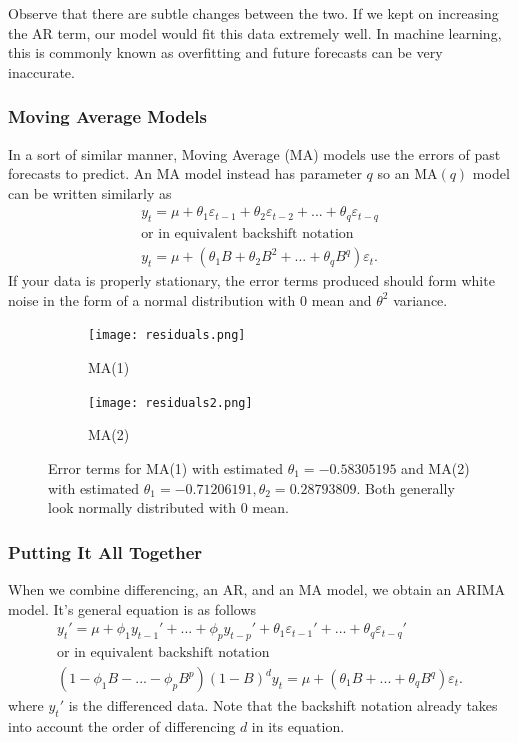 \documentclass{article}
\begin{document}
    Observe that there are subtle changes between the two. If we kept on increasing the AR term, our model would fit this data extremely well. In machine learning, this is commonly known as overfitting and future forecasts can be very inaccurate.

  \subsubsection{Moving Average Models}
    In a sort of similar manner, Moving Average (MA) models use the errors of past forecasts to predict. An MA model instead has parameter $q$ so an MA$(q)$ model can be written similarly as
    \begin{gather*}
      y_t = \mu + \theta_1 \varepsilon_{t-1} + \theta_2 \varepsilon_{t-2} + ... + \theta_q \varepsilon_{t-q}\\
      \text{or in equivalent backshift notation}\\
      y_t = \mu + (\theta_1B + \theta_2B^2 + ... + \theta_qB^q)\varepsilon_t.
    \end{gather*}
    If your data is properly stationary, the error terms produced should form white noise in the form of a normal distribution with $0$ mean and $\theta^2$ variance.

    \begin{figure}[H]
      \centering
      \captionsetup{justification=centering}
      \begin{subfigure}[b]{0.49\linewidth}
        \texttt{[image: residuals.png]}
        \caption{MA(1)}
      \end{subfigure}
      \begin{subfigure}[b]{0.49\linewidth}
        \texttt{[image: residuals2.png]}
        \caption{MA(2)}
      \end{subfigure}
      \caption{Error terms for MA(1) with estimated $\theta_1 = -0.58305195$ and MA(2) with estimated $\theta_1 = -0.71206191, \theta_2 =  0.28793809$. Both generally look normally distributed with 0 mean.}
    \end{figure}

  \subsubsection{Putting It All Together}
  When we combine differencing, an AR, and an MA model, we obtain an ARIMA model. It's general equation is as follows
  \begin{gather*}
    y_t' = \mu + \phi_1 y_{t-1}' + ... + \phi_p y_{t-p}' + \theta_1 \varepsilon_{t-1}' + ... + \theta_q \varepsilon_{t-q}'\\
    \text{or in equivalent backshift notation}\\
    (1 - \phi_1B - ... - \phi_pB^p)(1-B)^dy_t = \mu + (\theta_1B + ... + \theta_qB^q)\varepsilon_t.
  \end{gather*}
  where $y_t'$ is the differenced data. Note that the backshift notation already takes into account the order of differencing $d$ in its equation.
\end{document}
